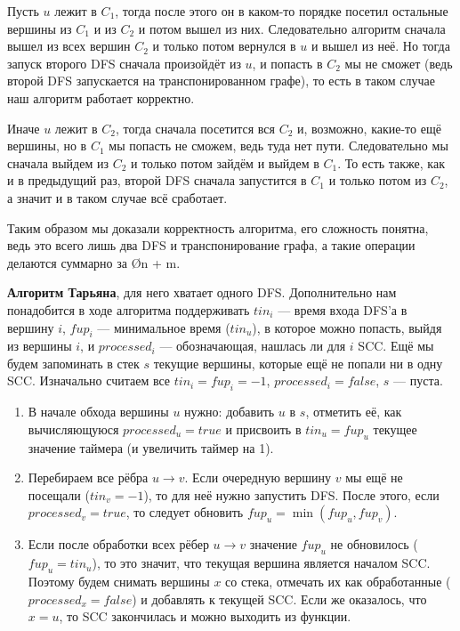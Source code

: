 Пусть $u$ лежит в $C_1$, тогда после этого он в каком-то порядке посетил остальные вершины из $C_1$ и из $C_2$ и потом вышел из них. Следовательно алгоритм сначала вышел из всех вершин $C_2$ и только потом вернулся в $u$ и вышел из неё. Но тогда запуск второго DFS сначала произойдёт из $u$, и попасть в $C_2$ мы не сможет (ведь второй DFS запускается на транспонированном графе), то есть в таком случае наш алгоритм работает корректно.

Иначе $u$ лежит в $C_2$, тогда сначала посетится вся $C_2$ и, возможно, какие-то ещё вершины, но в $C_1$ мы попасть не сможем, ведь туда нет пути. Следовательно мы сначала выйдем из $C_2$ и только потом зайдём и выйдем в $C_1$. То есть также, как и в предыдущий раз, второй DFS сначала запустится в $C_1$ и только потом из $C_2$, а значит и в таком случае всё сработает.

Таким образом мы доказали корректность алгоритма, его сложность понятна, ведь это всего лишь два DFS и транспонирование графа, а такие операции делаются суммарно за \O{n + m}.

\textbf{Алгоритм Тарьяна}, для него хватает одного DFS. Дополнительно нам понадобится в ходе алгоритма поддерживать $tin_i$ — время входа DFS'а в вершину $i$, $fup_i$ — минимальное время ($tin_u$), в которое можно попасть, выйдя из вершины $i$, и $processed_i$ — обозначающая, нашлась ли для $i$ SCC. Ещё мы будем запоминать в стек $s$ текущие вершины, которые ещё не попали ни в одну SCC. Изначально считаем все $tin_i = fup_i = -1$, $processed_i = false$, $s$ — пуста.

\begin{enumerate}
    \item В начале обхода вершины $u$ нужно: добавить $u$ в $s$, отметить её, как вычисляющуюся $processed_u = true$ и присвоить в $tin_u = fup_u$ текущее значение таймера (и увеличить таймер на 1).
    \item Перебираем все рёбра $u \to v$. Если очередную вершину $v$ мы ещё не посещали ($tin_v = -1$), то для неё нужно запустить DFS. После этого, если $processed_v = true$, то следует обновить $fup_u = \min(fup_u, fup_v)$.
    \item Если после обработки всех рёбер $u \to v$ значение $fup_u$ не обновилось ($fup_u = tin_u$), то это значит, что текущая вершина является началом SCC. Поэтому будем снимать вершины $x$ со стека, отмечать их как обработанные ($processed_x = false$) и добавлять к текущей SCC. Если же оказалось, что $x = u$, то SCC закончилась и можно выходить из функции.
\end{enumerate}

